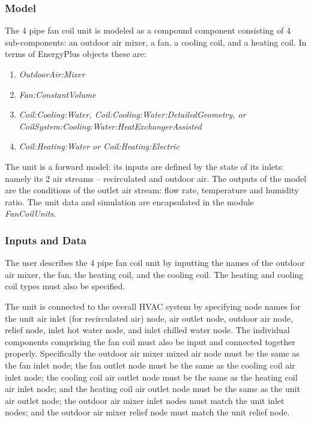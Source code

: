 \subsubsection{Model}\label{model-3-000}

The 4 pipe fan coil unit is modeled as a compound component consisting of 4 sub-components: an outdoor air mixer, a fan, a cooling coil, and a heating coil. In terms of EnergyPlus objects these are:

\begin{enumerate}
  \item \emph{OutdoorAir:Mixer}
  \item \emph{Fan:ConstantVolume}
  \item \emph{Coil:Cooling:Water, Coil:Cooling:Water:DetailedGeometry, or } \\ \emph{CoilSystem:Cooling:Water:HeatExchangerAssisted}
  \item \emph{Coil:Heating:Water or Coil:Heating:Electric}
\end{enumerate}

The unit is a forward model: its inputs are defined by the state of its inlets: namely its 2 air streams -- recirculated and outdoor air. The outputs of the model are the conditions of the outlet air stream: flow rate, temperature and humidity ratio. The unit data and simulation are encapsulated in the module \emph{FanCoilUnits}.

\subsubsection{Inputs and Data}\label{inputs-and-data-4}

The user describes the 4 pipe fan coil unit by inputting the names of the outdoor air mixer, the fan, the heating coil, and the cooling coil. The heating and cooling coil types must also be specified.

The unit is connected to the overall HVAC system by specifying node names for the unit air inlet (for recirculated air) node, air outlet node, outdoor air node, relief node, inlet hot water node, and inlet chilled water node. The individual components comprising the fan coil must also be input and connected together properly. Specifically the outdoor air mixer mixed air node must be the same as the fan inlet node; the fan outlet node must be the same as the cooling coil air inlet node; the cooling coil air outlet node must be the same as the heating coil air inlet node; and the heating coil air outlet node must be the same as the unit air outlet node; the outdoor air mixer inlet nodes must match the unit inlet nodes; and the outdoor air mixer relief node must match the unit relief node.

